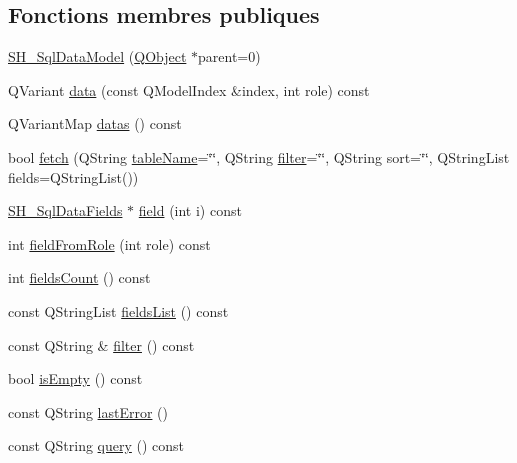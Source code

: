 \subsection*{Fonctions membres publiques}
\begin{DoxyCompactItemize}
\item 
\hyperlink{classSimpleHotel_1_1SH__SqlDataModel_ae8e87d5d89c5a585ed110f3bfd0a9d35}{S\-H\-\_\-\-Sql\-Data\-Model} (\hyperlink{classQObject}{Q\-Object} $\ast$parent=0)
\item 
Q\-Variant \hyperlink{classSimpleHotel_1_1SH__SqlDataModel_a6874d8547f590990f5aab80976ec7c6e}{data} (const Q\-Model\-Index \&index, int role) const 
\item 
Q\-Variant\-Map \hyperlink{classSimpleHotel_1_1SH__SqlDataModel_a5d9fef2dd53b01908f1b7eedfffc1fa5}{datas} () const 
\item 
bool \hyperlink{classSimpleHotel_1_1SH__SqlDataModel_ab8b74a08f668025c11c5446d4e4b469b}{fetch} (Q\-String \hyperlink{classSimpleHotel_1_1SH__SqlDataModel_a9228179700c32feac1ec5a495ca36f9f}{table\-Name}=\char`\"{}\char`\"{}, Q\-String \hyperlink{classSimpleHotel_1_1SH__SqlDataModel_ae7c93067c3e3fbbff663a407d4e8e4b4}{filter}=\char`\"{}\char`\"{}, Q\-String sort=\char`\"{}\char`\"{}, Q\-String\-List fields=Q\-String\-List())
\item 
\hyperlink{classSimpleHotel_1_1SH__SqlDataFields}{S\-H\-\_\-\-Sql\-Data\-Fields} $\ast$ \hyperlink{classSimpleHotel_1_1SH__SqlDataModel_a19ff52676ebed5ac65be5e0fe9d51171}{field} (int i) const 
\item 
int \hyperlink{classSimpleHotel_1_1SH__SqlDataModel_a37479e0592c4a8e671f6fb6d1162f1f8}{field\-From\-Role} (int role) const 
\item 
int \hyperlink{classSimpleHotel_1_1SH__SqlDataModel_a17632bfd3246d95554d3642089c3828b}{fields\-Count} () const 
\item 
const Q\-String\-List \hyperlink{classSimpleHotel_1_1SH__SqlDataModel_a9210c286bfe24038478c48cbdf42d144}{fields\-List} () const 
\item 
const Q\-String \& \hyperlink{classSimpleHotel_1_1SH__SqlDataModel_a9a66e492d6c2c9f3149fe867e403461b}{filter} () const 
\item 
bool \hyperlink{classSimpleHotel_1_1SH__SqlDataModel_ac86733a1f13cf44b38887d86b0449b4f}{is\-Empty} () const 
\item 
const Q\-String \hyperlink{classSimpleHotel_1_1SH__SqlDataModel_a65a44f7f5bcd8a4de5c5200c36281022}{last\-Error} ()
\item 
const Q\-String \hyperlink{classSimpleHotel_1_1SH__SqlDataModel_a5fb2e1fb1be51d27475ba5da8a4e68ec}{query} () const 

\end{DoxyCompactItemize}
